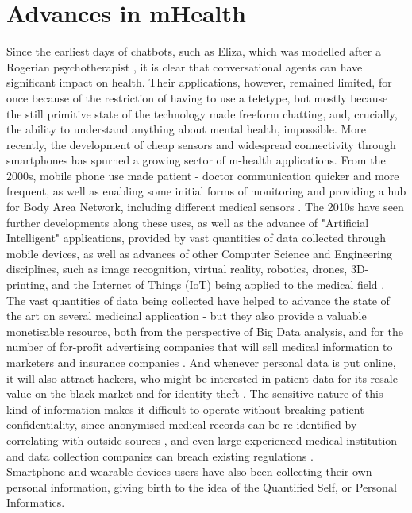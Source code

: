 \section{Advances in mHealth}
Since the earliest days of chatbots, such as Eliza, which was modelled after a Rogerian psychotherapist \cite{weizenbaum1966eliza}, it is clear that conversational agents can have significant impact on health. Their applications, however, remained limited, for once because of the restriction of having to use a teletype, but mostly because the still primitive state of the technology made freeform chatting, and, crucially, the ability to understand anything about mental health, impossible. More recently, the development of cheap sensors and widespread connectivity through smartphones has spurned a growing sector of m-health applications. From the 2000s, mobile phone use made patient - doctor communication quicker and more frequent, as well as enabling some initial forms of monitoring and providing a hub for Body Area Network, including different medical sensors \cite{Patrick2008}. The 2010s have seen further developments along these uses, as well as the advance of "Artificial Intelligent" applications, provided by vast quantities of data collected through mobile devices, as well as advances of other Computer Science and Engineering disciplines, such as image recognition, virtual reality, robotics, drones, 3D-printing, and the Internet of Things (IoT) being applied to the medical field \cite{Pistorius2017}. The vast quantities of data being collected have helped to advance the state of the art on several medicinal application - but they also provide a valuable monetisable resource, both from the perspective of Big Data analysis, and for the number of for-profit advertising companies that will sell medical information to marketers and insurance companies \cite{tanner2016}. And whenever personal data is put online, it will also attract hackers, who might be interested in patient data for its resale value on the black market and for identity theft \cite{hackercare}. The sensitive nature of this kind of information makes it difficult to operate without breaking patient confidentiality, since anonymised medical records can be re-identified by correlating with outside sources \cite{Sweeney2001}, and even large experienced medical institution and data collection companies can breach existing regulations \cite{deepmindnhs}. \\
Smartphone and wearable devices users have also been collecting their own personal information, giving birth to the idea of the Quantified Self, or Personal Informatics. \cite{rapp20014}
